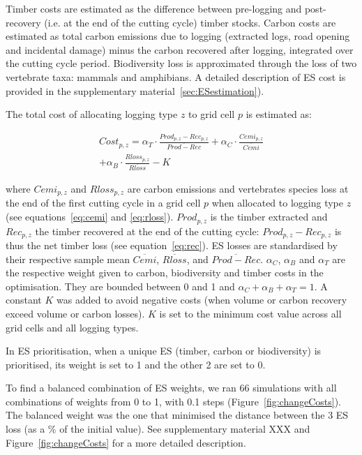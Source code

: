 \documentclass{article}
\begin{document}
Timber costs are estimated as the difference between pre-logging and post-recovery (i.e. at the end of the cutting cycle) timber stocks. 
Carbon costs are estimated as total carbon emissions due to logging (extracted logs, road opening and incidental damage) minus the carbon recovered after logging, integrated over the cutting cycle period. 
Biodiversity loss is approximated through the loss of two vertebrate taxa: mammals and amphibians. A detailed description of ES cost is provided in the supplementary material~\ref{sec:ESestimation}). 

The total cost of allocating logging type $z$ to grid cell $p$ is estimated as: 

\begin{equation}
\begin{split}
    Cost_{p,z} = \alpha _T \cdot \frac{Prod_{p,z} - Rec_{p,z}}{\overline{Prod - Rec}} + \alpha _C \cdot \frac{Cemi_{p,z}}{\overline{Cemi} } \\ + \alpha _B \cdot \frac{Rloss_{p,z}}{\overline{Rloss}} - K
    \end{split}
\end{equation}

where $Cemi_{p,z}$ and $Rloss_{p,z}$ are carbon emissions and vertebrates species loss at the end of the first cutting cycle in a grid cell $p$ when allocated to logging type $z$ (see equations~\ref{eq:cemi} and \ref{eq:rloss}). $Prod_{p,z}$ is the timber extracted and $Rec_{p,z}$ the timber recovered at the end of the cutting cycle: $Prod_{p,z} - Rec_{p,z}$ is thus the net timber loss (see equation~\ref{eq:rec}). 
ES losses are standardised by their respective sample mean $\overline{Cemi}$, $\overline{Rloss}$, and $\overline{Prod-Rec}$. 
$\alpha_C$, $\alpha_B$ and $\alpha_T$ are the respective weight given to carbon, biodiversity and timber costs in the optimisation. They are bounded between 0 and 1 and $\alpha_C+\alpha_B+\alpha_T = 1$. 
A constant $K$ was added to avoid negative costs (when volume or carbon recovery exceed volume or carbon losses). $K$ is set to the minimum cost value across all grid cells and all logging types. 

In ES prioritisation, when a unique ES (timber, carbon or biodiversity) is prioritised, its weight is set to 1 and the other 2 are set to 0. 

To find a balanced combination of ES weights, we ran 66 simulations with all combinations of weights from 0 to 1, with 0.1 steps (Figure~\ref{fig:changeCosts}). The balanced weight was the one that minimised the distance between the 3 ES loss (as a \% of the initial value). See supplementary material XXX and Figure~\ref{fig:changeCosts} for a more detailed description. 
\end{document}
